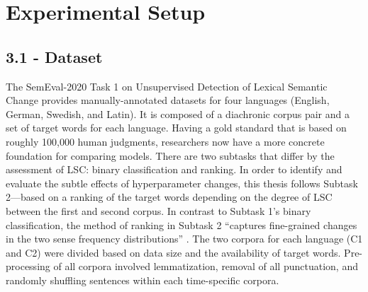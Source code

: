 \section{Experimental Setup}

\subsection{3.1 - Dataset}

The SemEval-2020 Task 1 on Unsupervised Detection of Lexical Semantic Change \citep{schlechtweg-etal-2020-semeval} provides manually-annotated datasets for four languages (English, German, Swedish, and Latin). It is composed of a diachronic corpus pair and a set of target words for each language. Having a gold standard that is based on roughly 100,000 human judgments, researchers now have a more concrete foundation for comparing models. There are two subtasks that differ by the assessment of LSC: binary classification and ranking. In order to identify and evaluate the subtle effects of hyperparameter changes, this thesis follows Subtask 2—based on a ranking of the target words depending on the degree of LSC between the first and second corpus. In contrast to Subtask 1’s binary classification, the method of ranking in Subtask 2 “captures fine-grained changes in the two sense frequency distributions” \citep{schlechtweg-etal-2020-semeval}. The two corpora for each language (C1 and C2) were divided based on data size and the availability of target words. Pre-processing of all corpora involved lemmatization, removal of all punctuation, and randomly shuffling sentences within each time-specific corpora.

